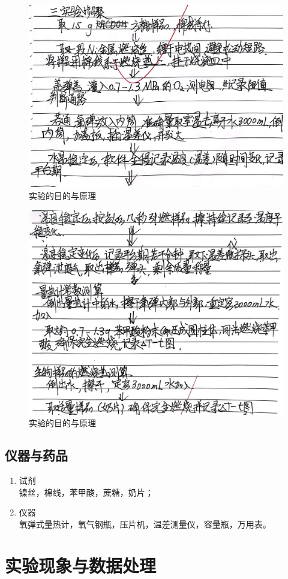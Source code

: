 \documentclass[cn,hazy,pku,12pt,normal,math=newtx,cite=super]{elegantnote}
\begin{document}
\begin{figure}[htbp]
    \centering
    \includegraphics[width = .70\textwidth]{image/yxbg_2.jpg}
    \caption{实验的目的与原理}\label{2}
\end{figure}

\begin{figure}[htbp]
    \centering
    \includegraphics[width = .70\textwidth]{image/yxbg_3.jpg}
    \caption{实验的目的与原理}\label{3}
\end{figure}

\subsection{仪器与药品}

\begin{enumerate} %
    \item 试剂 \\   镍丝，棉线，苯甲酸，蔗糖，奶片；
    \item 仪器 \\   氧弹式量热计，氧气钢瓶，压片机，温差测量仪，容量瓶，万用表。
\end{enumerate}

\section{实验现象与数据处理}
\end{document}
